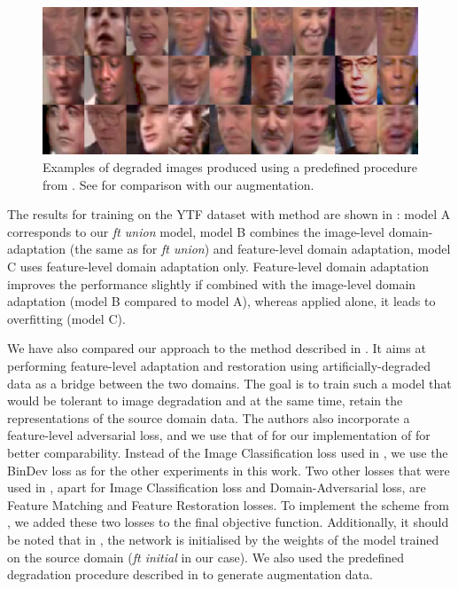    \begin{figure}
  \centering
    \includegraphics[width=\linewidth]{Chapters/facev1/Fig7.eps}
    \caption{Examples of degraded images produced using a predefined procedure from \citep{SohnLZY0C17}. See  for comparison with our augmentation. }\label{fig:predefined}
  \end{figure}
  
The results for training on the YTF dataset with  method \citep{ganin2016domain} are shown in : 
model A corresponds to our \textit{ft union} model, model B combines the image-level domain-adaptation (the same as for \textit{ft union}) and feature-level domain adaptation, model C uses feature-level domain adaptation only. Feature-level domain adaptation improves the performance slightly if combined with the image-level domain adaptation (model B compared to model A), whereas applied alone, it leads to overfitting (model C).

We have also compared our approach to the method described in \citep{SohnLZY0C17}. It aims at performing feature-level adaptation and restoration using artificially-degraded data as a bridge between the two domains. The goal is to train such a model that would be tolerant to image degradation and at the same time, retain the representations of the source domain data. 
The authors also incorporate a feature-level adversarial loss, and we use that of \citep{ganin2016domain} for our implementation of \citep{SohnLZY0C17} for better comparability. Instead of the Image Classification loss used in \citep{SohnLZY0C17}, we use the BinDev loss as for the other experiments in this work.
Two other losses that were used in \citep{SohnLZY0C17}, apart for Image Classification loss and Domain-Adversarial loss, are Feature Matching and Feature Restoration losses. To implement the scheme from \citep{SohnLZY0C17}, we added these two losses to the final objective function. Additionally, it should be noted that in \citep{SohnLZY0C17}, the network is initialised by the weights of the model trained on the source domain (\textit{ft initial} in our case). We also used the predefined degradation procedure described in \citep{SohnLZY0C17} to generate augmentation data.

